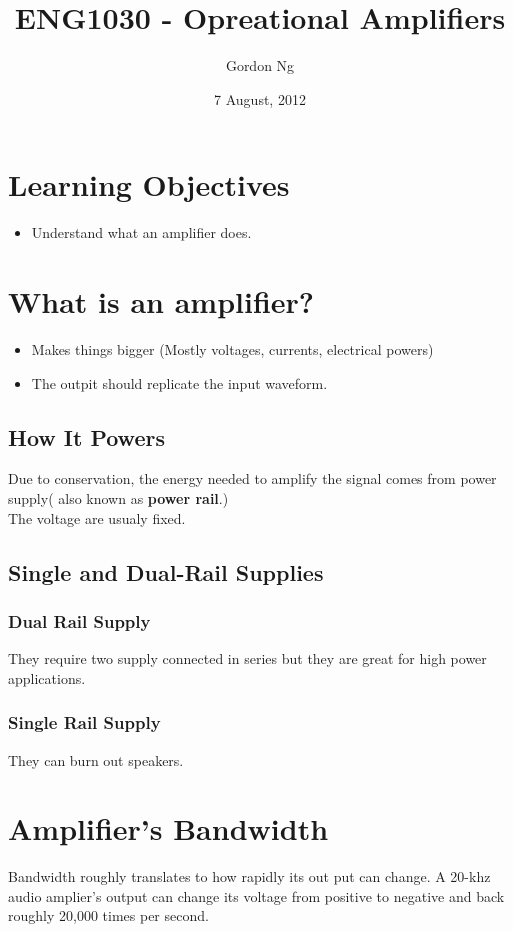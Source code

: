 \documentclass[12pt]{article}
\begin{document}
\title{ENG1030 - Opreational Amplifiers }
\date{7 August, 2012}
\author{Gordon Ng}
\maketitle

\pagebreak
\tableofcontents
\pagebreak
\section{Learning Objectives}
\begin{itemize}
\item Understand what an amplifier does.
\end{itemize}
\section{What is an amplifier?}
\begin{itemize}
\item Makes things bigger (Mostly voltages, currents, electrical powers)
\item The outpit should replicate the input waveform.
\end{itemize}
\subsection{How It Powers}
Due to conservation, the energy needed to amplify the signal comes from power supply( also known as \textbf{power rail}.)\\
The voltage are usualy fixed.
\subsection{Single and Dual-Rail Supplies}
\subsubsection{Dual Rail Supply}
They require two supply connected in series but they are great for high power applications.
\subsubsection{Single Rail Supply}
They can burn out speakers.
\section{Amplifier's Bandwidth}
Bandwidth roughly translates to how rapidly its out put can change.
A 20-khz audio amplier's output can change its voltage from positive to negative and back roughly 20,000 times per second.
\pagebreak
\end{document}
